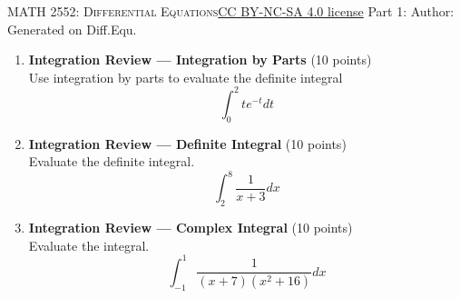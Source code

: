 \newpage\handout
{\textsc{MATH 2552: Differential Equations}}{\href{https://creativecommons.org/licenses/by-nc-sa/4.0/}{CC BY-NC-SA 4.0 license}}
{Part 1: }
{Author: \href{\HandoutAuthorUrl}{\HandoutAuthor}}{Generated on \generatedOn}
{Diff.Equ.}

\newpage

\begin{enumerate}
  \item \textbf{Integration Review --- Integration by Parts} (10 points)\\
  Use integration by parts to evaluate the definite integral
  $$
  \int_0^2 t e^{-t} d t
  $$
  \begin{subanswer}
  \end{subanswer}

  \item \textbf{Integration Review --- Definite Integral} (10 points)\\
  Evaluate the definite integral.
  $$
  \int_2^8 \frac{1}{x+3} d x
  $$
  \begin{subanswer}
  \end{subanswer}

  \item \textbf{Integration Review --- Complex Integral} (10 points)\\
  Evaluate the integral.
  $$
  \int_{-1}^1 \frac{1}{(x+7)\left(x^2+16\right)} d x
  $$
  \begin{subanswer}
  \end{subanswer}

  \newpage


\end{enumerate}
